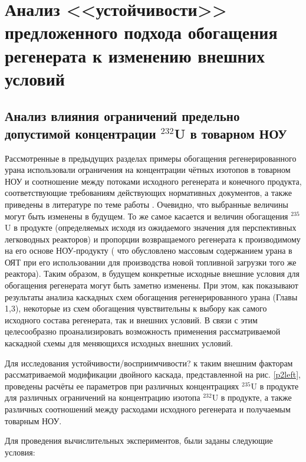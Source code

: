 \section{Анализ <<устойчивости>> предложенного подхода обогащения регенерата к изменению внешних условий}
\subsection{Анализ влияния ограничений предельно допустимой концентрации $^{232}$U в товарном НОУ}

Рассмотренные в предыдущих разделах примеры обогащения регенерированного урана использовали ограничения на концентрации чётных изотопов в товарном НОУ и соотношение между потоками исходного регенерата и конечного продукта, соответствующие требованиям действующих нормативных документов, а также приведены в литературе по теме работы \cite{smirnovKaskadnyeShemyZadachah2012}. Очевидно, что выбранные величины могут быть изменены в будущем. То же самое касается и величин обогащения $^{235}$U в продукте (определяемых исходя из ожидаемого значения для перспективных легководных реакторов) и пропорции возвращаемого регенерата к производимому на его основе НОУ-продукту ( что обусловлено массовым содержанием урана в ОЯТ при его использовании для производства новой топливной загрузки того же реактора). Таким образом, в будущем конкретные исходные внешние условия для обогащения регенерата могут быть заметно изменены. При этом, как показывают результаты анализа каскадных схем обогащения регенерированного урана (Главы 1,3), некоторые из схем обогащения чувствительны к выбору как самого исходного состава регенерата, так и внешних условий. В связи с этим целесообразно проанализировать возможность применения рассматриваемой каскадной схемы для меняющихся исходных внешних условий.

Для исследования устойчивости/восприимчивости? к таким внешним факторам рассматриваемой модификации двойного каскада, представленной на рис. \ref{p2left}, проведены расчёты ее параметров при различных концентрациях $^{235}$U в продукте для различных ограничений на концентрацию изотопа $^{232}$U в продукте, а также различных соотношений между расходами исходного регенерата и получаемым товарным НОУ.

Для проведения вычислительных экспериментов, были заданы следующие условия:

